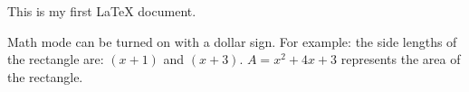 \documentclass[11]{article}
\begin{document}
This is my first LaTeX document.

Math mode can be turned on with a dollar sign. For example: the side lengths of the rectangle are: $(x + 1)$ and $(x + 3)$. 
$A = x^2 + 4x + 3 $ represents the area of the rectangle.
\end{document}
